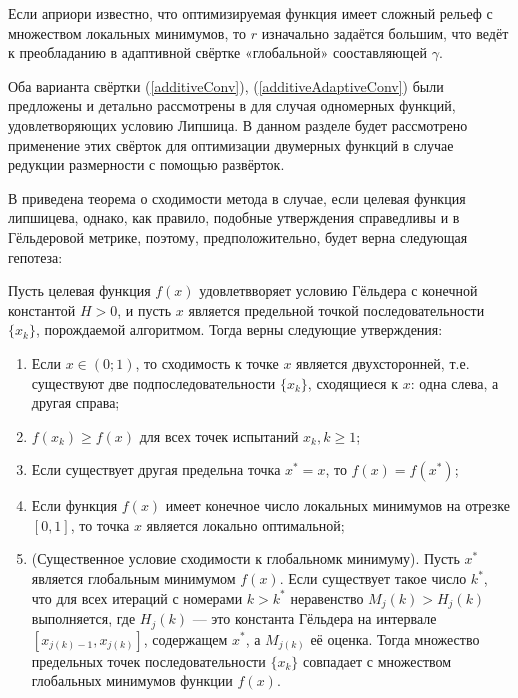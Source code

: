 Если априори известно, что оптимизируемая функция имеет сложный рельеф с множеством
локальных минимумов, то \(r\) изначально задаётся большим, что ведёт к преобладанию в
адаптивной свёртке «глобальной» сооставляющей \(\gamma\).

Оба варианта свёртки (\ref{additiveConv}), (\ref{additiveAdaptiveConv}) были предложены
и детально рассмотрены в \cite{sergLocalTuning} для случая одномерных функций,
удовлетворяющих условию Липшица. В данном разделе будет рассмотрено применение этих
свёрток для оптимизации двумерных функций в случае редукции размерности с помощью развёрток.

В \cite{sergLocalTuning} приведена теорема о сходимости метода в случае, если целевая функция
липшицева, однако, как правило, подобные утверждения справедливы и в Гёльдеровой метрике, поэтому,
предположительно, будет верна следующая гепотеза:
\begin{hypothesis}
Пусть целевая функция \(f(x)\) удовлетвворяет условию Гёльдера с конечной константой
\(H > 0\), и пусть \(x\) является предельной точкой последовательности \(\{x_k\}\),
порождаемой алгоритмом. Тогда верны следующие утверждения:
\begin{enumerate}
  \item Если \(x\in(0;1)\), то сходимость к точке \(x\) является двухсторонней, т.е.
  существуют две подпоследовательности \(\{x_k\}\), сходящиеся к \(x\): одна слева,
  а другая справа;
  \item \(f(x_k) \geqslant f(x)\) для всех точек испытаний \(x_k, k \geqslant 1\);
  \item Если существует другая предельна точка \(x^* = x\), то \(f(x) = f(x^*)\);
  \item Если функция \(f(x)\) имеет конечное число локальных минимумов на отрезке \([0, 1]\),
  то точка \(x\) является локально оптимальной;
  \item (Существенное условие сходимости к глобальномк минимуму). Пусть \(x^*\)
  является глобальным минимумом \(f(x)\). Если существует такое число \(k^*\),
  что для всех итераций с номерами \(k > k^*\) неравенство
  \(M_j(k) > H_j(k)\) выполняется, где \(H_j(k)\) --- это константа Гёльдера на интервале
  \([x_{j(k)-1}, x_{j(k)}]\), содержащем \(x^*\), а \(M_{j(k)}\) её оценка.
  Тогда множество предельных точек последовательности \(\{x_k\}\) совпадает с множеством
  глобальных минимумов функции \(f(x)\).
\end{enumerate}
\end{hypothesis}

